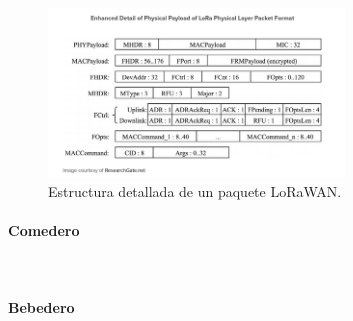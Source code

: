 \documentclass[12pt]{article}
\newcommand{\subsubsubsection}[1]{\paragraph{#1}\mbox{}\\}
\begin{document}
	
	\begin{figure}[h]
	\begin{center}
			\includegraphics[width=0.7\textwidth]{img/lora_phyLayer_packetFormat_enh.png}
			\caption{Estructura detallada de un paquete LoRaWAN.}
	\end{center}
	\end{figure}

	\pagebreak

	
	

	

	\subsubsubsection{Comedero}
	
	\subsubsubsection{Bebedero}
	
\end{document}
